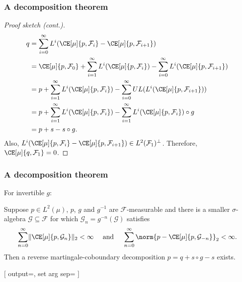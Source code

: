 \documentclass[shortlabels, 9pt, aspectratio=2013]{beamer}
\begin{document}
\begin{frame}[fragile]
  \frametitle{A decomposition theorem}
  \begin{proof}[Proof sketch (cont.)]
    \vspace{-1.5em}
    \begin{align*}
      q &= \sum_{i = 0}^{\infty} L^i(\CE[\mu]{p,\mathcal{F}_i} - \CE[\mu]{p, \mathcal{F}_{i + 1}}) \\
        &=
          \CE[\mu]{p,\mathcal{F}_0} + 
          \sum_{i = 1}^{\infty} L^i(\CE[\mu]{p,\mathcal{F}_i}) - 
          \sum_{i = 0}^{\infty} L^i(\CE[\mu]{p, \mathcal{F}_{i + 1}})\\
        &=
          p +
          \sum_{i = 1}^{\infty} L^i(\CE[\mu]{p,\mathcal{F}_i}) - 
          \sum_{i = 0}^{\infty} UL(L^i(\CE[\mu]{p, \mathcal{F}_{i + 1}}))\\
        &=
          p +
          \sum_{i = 1}^{\infty} L^i(\CE[\mu]{p,\mathcal{F}_i}) - 
          \sum_{i = 1}^{\infty} L^i(\CE[\mu]{p, \mathcal{F}_{i}}) \circ g\\
        &=
          p + s - s \circ g.
    \end{align*}
    Also, \(L^i(\CE[\mu]{p,\mathcal{F}_i} - \CE[\mu]{p, \mathcal{F}_{i + 1}}) \in L^2(\mathcal{F}_1)^{\bot}\). Therefore, \(\CE[\mu]{q,\mathcal{F}_1} = 0\).
  \end{proof}
\end{frame}

\begin{frame}
  \frametitle{A decomposition theorem}
  For invertible \(g\):
  \begin{theorem}
    Suppose \(p \in L^2(\mu)\), \(p\), \(g\) and \(g^{-1}\) are \(\mathcal{F}\)-measurable and there is a smaller \(\sigma\)-algebra \(\mathcal{G} \subseteq \mathcal{F}\) for which \(\mathcal{G}_n = g^{-n}(\mathcal{G})\) satisfies
    \begin{equation*}
      \sum_{n = 0}^{\infty} \lVert \CE[\mu]{p, \mathcal{G}_n} \rVert_2 < \infty\quad \text{ and }
      \quad \sum_{n = 0}^{\infty} \norm{p - \CE[\mu]{p,\mathcal{G}_{-n}}}_2 < \infty.
    \end{equation*}
    Then a reverse martingale-coboundary decomposition \(p = q + s \circ g - s\) exists.
  \end{theorem}
\end{frame}

\NewObject{}[
output=\RandomVariable,
set arg sep={\where}
]
\end{document}
